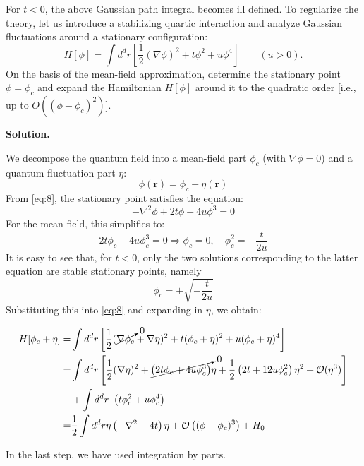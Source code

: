 \documentclass[11pt,a4paper]{article}
\newcounter{problem}
\newcounter{saveequation}
\newenvironment{solution}
{
	\par
	\setcounter{saveequation}{\value{equation}}
	\begingroup
	\setcounter{equation}{0}
	\renewcommand{\theequation}{\arabic{problem}.\arabic{equation}}
	\renewcommand{\theHequation}{sol.\arabic{problem}.\arabic{equation}}
	\noindent\textbf{Solution.}\quad
}
{
	\par
	\endgroup
	\setcounter{equation}{\value{saveequation}}
}
\begin{document}
	\begin{problembox}
		For $t < 0$, the above Gaussian path integral becomes ill defined. To regularize the theory, let us introduce a stabilizing quartic interaction and analyze Gaussian fluctuations around a stationary configuration:
		\begin{equation}
			\label{eq:8}
			H[\phi] = \int d^d r\left[\frac{1}{2}(\nabla\phi)^2 + t\phi^2 + u\phi^4\right]\qquad (u > 0).
		\end{equation}
		On the basis of the mean-field approximation, determine the stationary point $\phi = \phi_c$ and expand the Hamiltonian $H[\phi]$ around it to the quadratic order [i.e., up to $O((\phi-\phi_c)^2)$].
	\end{problembox}
	\begin{solution}
	We decompose the quantum field into a mean-field part $\phi_c$ (with $\nabla\phi=0$) and a quantum fluctuation part $\eta$:
	\begin{equation}
		\phi(\mathbf{r})=\phi_c+\eta(\mathbf{r})
	\end{equation}
	From \eqref{eq:8}, the stationary point satisfies the equation:
	\begin{equation}
		-\nabla^2\phi+2t\phi+4u\phi^3=0
	\end{equation}
	For the mean field, this simplifies to:
	\begin{equation}
		2t\phi_c+4u\phi_c^3=0\Rightarrow\phi_c=0,\quad \phi_c^2=-\frac{t}{2u}
	\end{equation}
	It is easy to see that, for $t<0$, only the two solutions corresponding to the latter equation are stable stationary points, namely
	\begin{equation}
		\phi_c=\pm\sqrt{-\frac{t}{2u}}
	\end{equation}
	Substituting this into \eqref{eq:8} and expanding in $\eta$, we obtain:
\begin{finalanswer}
		\begin{equation}
		\label{fin:7}
		\begin{aligned}
			H[\phi_c+\eta] = &\int d^d r\left[\frac{1}{2}(\cancelto{0}{\nabla\phi_c}+\nabla\eta)^2 + t(\phi_c+\eta)^2 + u(\phi_c+\eta)^4\right]\\
			= &\int d^d r\left[\frac{1}{2}(\nabla\eta)^2 +\cancelto{ 0}{\left(2t\phi_c+4u\phi_c^3\right)}\eta+\frac12 \left(2t+12u\phi_c^2\right)\eta^2+\mathcal{O}(\eta^3)\right]\\
			&+\int d^d{r~}\left(t\phi_c^2+u\phi_c^4\right)\\
			=&\frac12 \int d^dr\eta\left(-\nabla^2-4t\right)\eta+\mathcal{O}\left((\phi-\phi_c)^3\right)+H_0
		\end{aligned}
	\end{equation}
\end{finalanswer}
	In the last step, we have used integration by parts.
	\end{solution}
	
\end{document}
